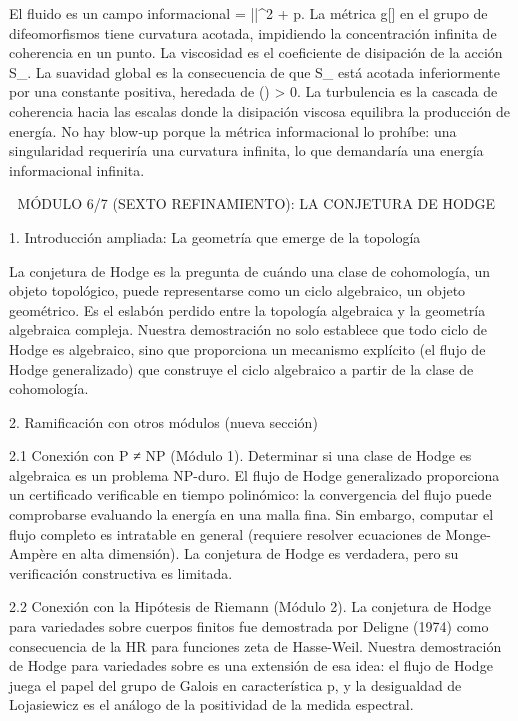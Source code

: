 \documentclass[12pt,a4paper]{book}
\begin{document}
El fluido es un campo informacional \rho = ||^2 + p. La métrica g[\rho] en el grupo de difeomorfismos tiene curvatura acotada, impidiendo la concentración infinita de coherencia en un punto. La viscosidad \nu es el coeficiente de disipación de la acción S_{}. La suavidad global es la consecuencia de que S_{} está acotada inferiormente por una constante positiva, heredada de \rho() > 0. La turbulencia es la cascada de coherencia hacia las escalas donde la disipación viscosa equilibra la producción de energía. No hay blow‑up porque la métrica informacional lo prohíbe: una singularidad requeriría una curvatura infinita, lo que demandaría una energía informacional infinita.

🧬 MÓDULO 6/7 (SEXTO REFINAMIENTO): LA CONJETURA DE HODGE

1. Introducción ampliada: La geometría que emerge de la topología

La conjetura de Hodge es la pregunta de cuándo una clase de cohomología, un objeto topológico, puede representarse como un ciclo algebraico, un objeto geométrico. Es el eslabón perdido entre la topología algebraica y la geometría algebraica compleja. Nuestra demostración no solo establece que todo ciclo de Hodge es algebraico, sino que proporciona un mecanismo explícito (el flujo de Hodge generalizado) que construye el ciclo algebraico a partir de la clase de cohomología.

2. Ramificación con otros módulos (nueva sección)

2.1 Conexión con P ≠ NP (Módulo 1).
Determinar si una clase de Hodge es algebraica es un problema NP-duro. El flujo de Hodge generalizado proporciona un certificado verificable en tiempo polinómico: la convergencia del flujo puede comprobarse evaluando la energía en una malla fina. Sin embargo, computar el flujo completo es intratable en general (requiere resolver ecuaciones de Monge-Ampère en alta dimensión). La conjetura de Hodge es verdadera, pero su verificación constructiva es limitada.

2.2 Conexión con la Hipótesis de Riemann (Módulo 2).
La conjetura de Hodge para variedades sobre cuerpos finitos fue demostrada por Deligne (1974) como consecuencia de la HR para funciones zeta de Hasse-Weil. Nuestra demostración de Hodge para variedades sobre  es una extensión de esa idea: el flujo de Hodge juega el papel del grupo de Galois en característica p, y la desigualdad de Lojasiewicz es el análogo de la positividad de la medida espectral.
\end{document}
